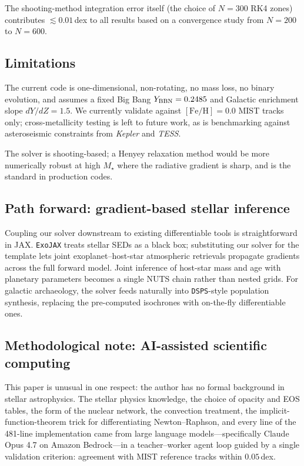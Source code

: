 \documentclass[twocolumn]{aastex631}
\newcommand{\code}[1]{\texttt{#1}}
\begin{document}
The shooting-method integration error itself (the choice of $N=300$
RK4 zones) contributes $\lesssim 0.01\,$dex to all results based on a
convergence study from $N=200$ to $N=600$.

\subsection{Limitations}

The current code is one-dimensional, non-rotating, no mass loss, no
binary evolution, and assumes a fixed Big Bang $Y_{\rm BBN} = 0.2485$
and Galactic enrichment slope $dY/dZ = 1.5$. We currently validate
against $[\textrm{Fe/H}] = 0.0$ MIST tracks only; cross-metallicity
testing is left to future work, as is benchmarking against
asteroseismic constraints from \emph{Kepler} and \emph{TESS}.

The solver is shooting-based; a Henyey relaxation method
\citep{Henyey1959} would be more numerically robust at high $M_\star$
where the radiative gradient is sharp, and is the standard in
production codes.

\subsection{Path forward: gradient-based stellar inference}

Coupling our solver downstream to existing differentiable tools is
straightforward in JAX. \code{ExoJAX} \citep{2022ApJS..258...31K}
treats stellar SEDs as a black box; substituting our solver for the
template lets joint exoplanet--host-star atmospheric retrievals
propagate gradients across the full forward model. Joint inference of
host-star mass and age with planetary parameters becomes a single
NUTS chain rather than nested grids. For galactic archaeology, the
solver feeds naturally into \code{DSPS}-style population synthesis,
replacing the pre-computed isochrones with on-the-fly differentiable
ones.

\subsection{Methodological note: AI-assisted scientific computing}

This paper is unusual in one respect: the author has no formal
background in stellar astrophysics. The stellar physics knowledge,
the choice of opacity and EOS tables, the form of the nuclear network,
the convection treatment, the implicit-function-theorem trick for
differentiating Newton--Raphson, and every line of the 481-line
implementation came from large language models---specifically Claude
Opus 4.7 on Amazon Bedrock---in a teacher--worker agent loop guided
by a single validation criterion: agreement with MIST reference
tracks within $0.05\,$dex.
\end{document}
